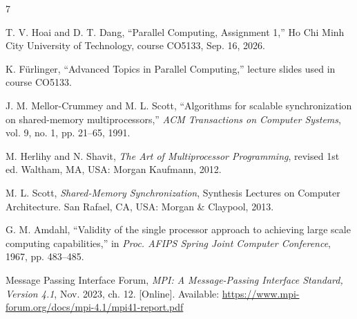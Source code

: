 \newpage
\begingroup\sloppy
\begin{thebibliography}{7}
 T. V. Hoai and D. T. Dang, ``Parallel Computing, Assignment 1,'' Ho Chi Minh City University of Technology, course CO5133, Sep. 16, 2026.

 K. Fürlinger, ``Advanced Topics in Parallel Computing,'' lecture slides used in course CO5133.

 J. M. Mellor-Crummey and M. L. Scott, ``Algorithms for scalable synchronization on shared-memory multiprocessors,'' \textit{ACM Transactions on Computer Systems}, vol. 9, no. 1, pp. 21--65, 1991.

 M. Herlihy and N. Shavit, \textit{The Art of Multiprocessor Programming}, revised 1st ed. Waltham, MA, USA: Morgan Kaufmann, 2012.

 M. L. Scott, \textit{Shared-Memory Synchronization}, Synthesis Lectures on Computer Architecture. San Rafael, CA, USA: Morgan \& Claypool, 2013.

 G. M. Amdahl, ``Validity of the single processor approach to achieving large scale computing capabilities,'' in \textit{Proc. AFIPS Spring Joint Computer Conference}, 1967, pp. 483--485.

 Message Passing Interface Forum, \textit{MPI: A Message-Passing Interface Standard, Version 4.1}, Nov. 2023, ch. 12. [Online]. Available: \url{https://www.mpi-forum.org/docs/mpi-4.1/mpi41-report.pdf}
\end{thebibliography}
\endgroup
